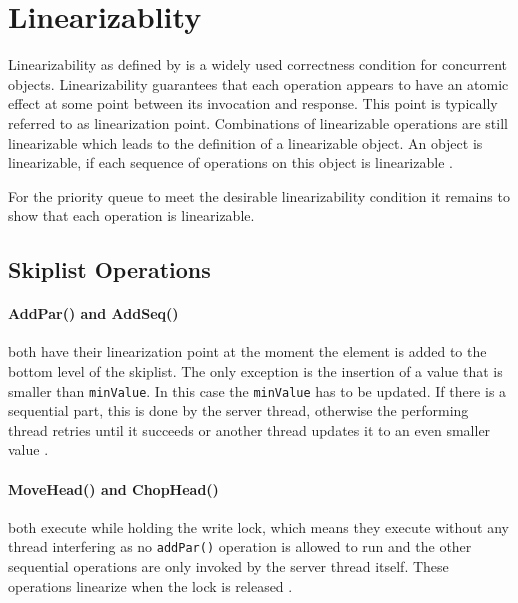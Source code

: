 
\section{Linearizablity}
\label{sec:linearizablity}

Linearizability as defined by \citeauthor{herlihy_linearizability:_1990} is a widely used correctness condition for concurrent objects. Linearizability guarantees that each operation appears to have an atomic effect at some point between its invocation and response. This point is typically referred to as linearization point. Combinations of linearizable operations are still linearizable which leads to the definition of a linearizable object. An object is linearizable, if each sequence of operations on this object is linearizable \cite{herlihy_linearizability:_1990}.

For the priority queue to meet the desirable linearizability condition it remains to show that each operation is linearizable. 

\subsection{Skiplist Operations}

\paragraph{AddPar() and AddSeq()}

both have their linearization point at the moment the element is added to the bottom level of the skiplist. The only exception is the insertion of a value that is smaller than \texttt{minValue}. In this case the \texttt{minValue} has to be updated. If there is a sequential part, this is done by the server thread, otherwise the performing thread retries until it succeeds or another thread updates it to an even smaller value  \cite{calciu_adaptive_2014}.


\paragraph{MoveHead() and ChopHead()}

both execute while holding the write lock, which means they execute without any thread interfering as no \texttt{addPar()} operation is allowed to run and the other sequential operations are only invoked by the server thread itself. These operations linearize when the lock is released \cite{calciu_adaptive_2014}.

